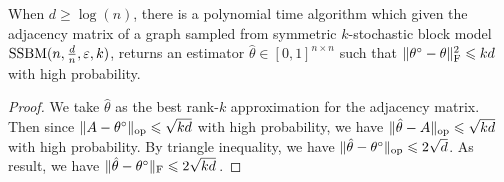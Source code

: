 \begin{theorem}\label{thm:algorithm-learning-sbm}
    When $d\geq \log(n)$, there is a polynomial time algorithm which given the adjacency matrix of a graph sampled from symmetric $k$-stochastic block model $\text{SSBM}(n,\frac{d}{n},\varepsilon,k)$, returns an estimator $\hat{\theta}\in [0,1]^{n\times n}$ such that $\lVert\theta^\circ-\theta\rVert_{\mathrm{F}}^2\leqslant kd$ with high probability.
\end{theorem}
\begin{proof}
    We take $\hat{\theta}$ as the best rank-$k$ approximation for the adjacency matrix. 
    Then since $\lVert A-\theta^\circ\rVert_{\mathrm{op}}\leqslant \sqrt{kd}$ with high probability, we have $\lVert\hat{\theta}-A\rVert_{\mathrm{op}}\leqslant \sqrt{kd}$ with high probability.
    By triangle inequality, we have $\lVert\hat{\theta}-\theta^\circ\rVert_{\mathrm{op}}\leqslant 2\sqrt{d}$.
    As result, we have
\( \lVert\hat{\theta}-\theta^\circ\rVert_{\mathrm{F}}\leqslant 2\sqrt{kd}\)\,.
\end{proof}
